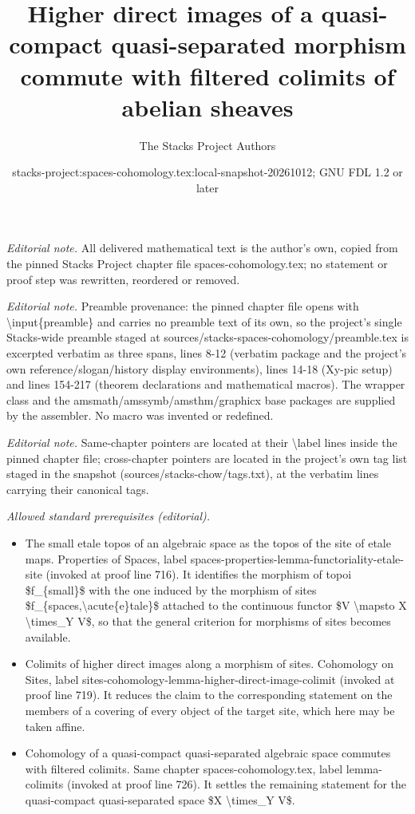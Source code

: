 \documentclass[10pt,a4paper]{amsart}
\title{Higher direct images of a quasi-compact quasi-separated morphism commute with filtered colimits of abelian sheaves}
\author{The Stacks Project Authors}
\date{stacks-project:spaces-cohomology.tex:local-snapshot-20261012; GNU FDL 1.2 or later}
\theoremstyle{plain}
\theoremstyle{definition}
\theoremstyle{remark}
\numberwithin{equation}{subsection}
\begin{document}
\maketitle
\noindent\textit{Editorial note.} All delivered mathematical text is the author's own, copied from the pinned Stacks Project chapter file spaces-cohomology.tex; no statement or proof step was rewritten, reordered or removed.\par\medskip
\noindent\textit{Editorial note.} Preamble provenance: the pinned chapter file opens with \textbackslash{}input\{preamble\} and carries no preamble text of its own, so the project's single Stacks-wide preamble staged at sources/stacks-spaces-cohomology/preamble.tex is excerpted verbatim as three spans, lines 8-12 (verbatim package and the project's own reference/slogan/history display environments), lines 14-18 (Xy-pic setup) and lines 154-217 (theorem declarations and mathematical macros). The wrapper class and the amsmath/amssymb/amsthm/graphicx base packages are supplied by the assembler. No macro was invented or redefined.\par\medskip
\noindent\textit{Editorial note.} Same-chapter pointers are located at their \textbackslash{}label lines inside the pinned chapter file; cross-chapter pointers are located in the project's own tag list staged in the snapshot (sources/stacks-chow/tags.txt), at the verbatim lines carrying their canonical tags.\par\medskip
\noindent\textit{Allowed standard prerequisites (editorial).}\begin{itemize}
\item The small etale topos of an algebraic space as the topos of the site of etale maps. Properties of Spaces, label spaces-properties-lemma-functoriality-etale-site (invoked at proof line 716). It identifies the morphism of topoi \$f\_\{small\}\$ with the one induced by the morphism of sites \$f\_\{spaces,\textbackslash{}acute\{e\}tale\}\$ attached to the continuous functor \$V \textbackslash{}mapsto X \textbackslash{}times\_Y V\$, so that the general criterion for morphisms of sites becomes available.
\item Colimits of higher direct images along a morphism of sites. Cohomology on Sites, label sites-cohomology-lemma-higher-direct-image-colimit (invoked at proof line 719). It reduces the claim to the corresponding statement on the members of a covering of every object of the target site, which here may be taken affine.
\item Cohomology of a quasi-compact quasi-separated algebraic space commutes with filtered colimits. Same chapter spaces-cohomology.tex, label lemma-colimits (invoked at proof line 726). It settles the remaining statement for the quasi-compact quasi-separated space \$X \textbackslash{}times\_Y V\$.
\end{itemize}\medskip
\end{document}
